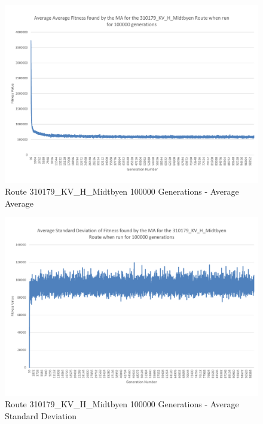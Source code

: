\begin{landscape}
\begin{figure}[thbp]
	\centerline{\includegraphics[height=0.945\textwidth]{figures/Trondheim_graphs/KV_H/KV_H-100k_average_average.pdf}}
	\caption{Route 310179\_KV\_H\_Midtbyen 100000 Generations - Average Average}
	\label{fig:KV_H_100k_aa}
\end{figure}
\end{landscape}

\begin{landscape}
\begin{figure}[thbp]
	\centerline{\includegraphics[height=0.945\textwidth]{figures/Trondheim_graphs/KV_H/KV_H-100k_average_standard_deviation.pdf}}
	\caption{Route 310179\_KV\_H\_Midtbyen 100000 Generations - Average Standard Deviation}
	\label{fig:KV_H_100k_astd}
\end{figure}
\end{landscape}

